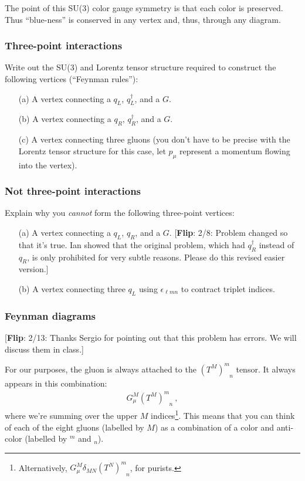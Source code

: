 \documentclass[12pt]{article}
\newcommand{\flip}[1]{{\color{red} [\textbf{Flip}: {#1}]}}
\begin{document}
The point of this SU(3) color gauge symmetry is that each color is preserved. Thus ``blue-ness'' is conserved in any vertex and, thus, through any diagram.

\subsubsection{Three-point interactions}



Write out the SU(3) and Lorentz tensor structure required to construct the following vertices (``Feynman rules''):
\begin{enumerate}
	\item[(a)] A vertex connecting a $q_L$, $q_L^\dag$, and a $G$. 
	\item[(b)] A vertex connecting a $q_R$, $q_R^\dag$, and a $G$. 
	\item[(c)] A vertex connecting three gluons (you don't have to be precise with the Lorentz tensor structure for this case, let $p_\mu$ represent a momentum flowing into the vertex). 
\end{enumerate}

\subsubsection{Not three-point interactions}

Explain why you \emph{cannot} form the following three-point vertices:
\begin{enumerate}
	\item[(a)] A vertex connecting a $q_L$, $q_R$, and a $G$. \flip{2/8: Problem changed so that it's true. Ian showed that the original problem, which had $q_R^\dag$ instead of $q_R$, is only prohibited for very subtle reasons. Please do this revised easier version.}
	\item[(b)] A vertex connecting three $q_L$ using $\epsilon_{\ell m n}$ to contract triplet indices.
\end{enumerate}

\subsubsection{Feynman diagrams}
\label{sec:gluon}

\flip{2/13: Thanks Sergio for pointing out that this problem has errors. We will discuss them in class.}

For our purposes, the gluon is always attached to the $(T^M)^m_{\phantom{m}n}$ tensor. It always appears in this combination:
\begin{align}
	G_\mu^M (T^M)^m_{\phantom{m}n} \ ,
\end{align}
where we're summing over the upper $M$ indices\footnote{Alternatively, $G_\mu^M \delta_{MN}(T^N)^m_{\phantom{m}n}$, for purists.}. This means that you can think of each of the eight gluons (labelled by $M$) as a combination of a color and anti-color (labelled by $^m$ and $_n$).
\end{document}
